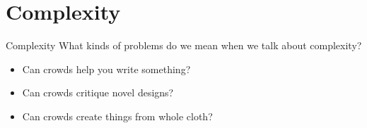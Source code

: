 \documentclass[presentation]{subfiles}
\begin{document}
\section{Complexity}

\begin{frame}{Complexity}
  What kinds of problems do we mean when we talk about complexity?
  \begin{itemize}
    \item<1-> Can crowds help you write something?
    
    \scriptsize{
      \textcite{bernsteinSoylent,Kim:2014:CSI:2556288.2556986,Nebeling:2016:WCW:2858036.2858169}
    }
    \item<2-> Can crowds critique novel designs?
    
    \scriptsize{
      \textcite{yuanAlmost,fuge2014analysis}
    }
    \item<3-> Can crowds create things from whole cloth?
    
    \scriptsize{
      \textcite{KimStoria,Kim2017,Hahn:2016:KAB:2858036.2858364,Lasecki:2014:LSR:2661334.2661352}
    }
  \end{itemize}
\end{frame}
\end{document}
